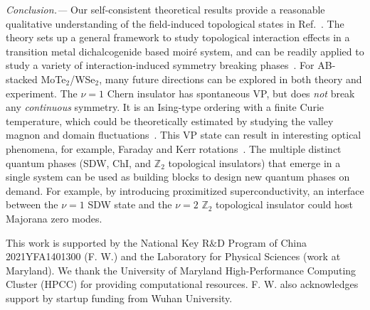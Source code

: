 \documentclass[aps,prl,twocolumn,superscriptaddress,longbibliography]{revtex4-2}
\begin{document}
\textit{Conclusion.---} Our self-consistent theoretical results provide a reasonable qualitative understanding of the field-induced topological states in Ref.~. The theory sets up a general framework to study topological interaction effects in a transition metal dichalcogenide based moir\'e system, and can be readily applied to study a variety of interaction-induced symmetry breaking phases~\cite{wang2020correlated, xu2020correlated, gu2021dipolar,zhang2021correlated,pan2021interactiondriven,pan2020quantum,pan2020band,pan2022interaction}. For AB-stacked MoTe$_2$/WSe$_2$, many future directions can be explored in both theory and experiment. The $\nu=1$ Chern insulator has spontaneous VP, but does {\it not} break any {\it continuous} symmetry. It is an Ising-type ordering with a finite Curie temperature, which could be theoretically estimated by studying the valley magnon and domain fluctuations~\cite{wu2020collective}. This VP state can result in interesting optical phenomena, for example, Faraday and Kerr rotations~\cite{tse2010giant}. The multiple distinct quantum phases (SDW, ChI, and $\mathbb{Z}_2$ topological insulators) that emerge in a single system can be used as building blocks to design new quantum phases on demand. For example, by introducing proximitized superconductivity, an interface between the $\nu=1$ SDW state and the $\nu=2$ $\mathbb{Z}_2$ topological insulator could host Majorana zero modes. 

This work is supported by the National Key R$\&$D Program of China 2021YFA1401300 (F. W.) and the Laboratory for Physical Sciences (work at Maryland). We thank the University of Maryland High-Performance Computing Cluster (HPCC) for providing computational resources. F. W. also acknowledges support by startup funding from Wuhan University.


\end{document}
